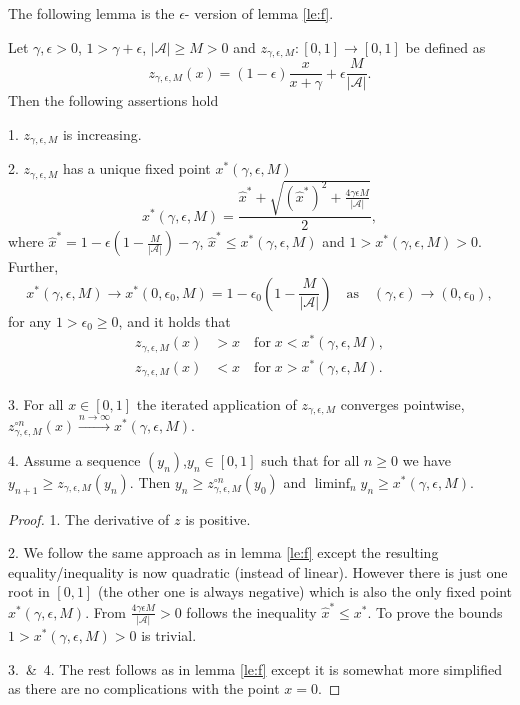 The following lemma is the $\epsilon$-\eUDRL{} version of lemma \ref{le:f}.
\begin{lemma}
\label{le:z}
Let $\gamma,\epsilon > 0$, $1 > \gamma +\epsilon$, $|\mathcal{A}| \geq M > 0$ and $z_{\gamma,\epsilon,M}:[0,1] \rightarrow [0,1]$ be defined as
$$
z_{\gamma,\epsilon,M}(x) =
(1-\epsilon)\frac{x}
{x + \gamma}
+ \epsilon \frac{M}{|\mathcal{A}|}.
$$
Then the following assertions hold
\begin{description}
\item{1.} $z_{\gamma,\epsilon,M}$ is increasing.
\item{2.} $z_{\gamma,\epsilon,M}$ has a unique fixed point $x^*(\gamma,\epsilon,M)$
$$
x^*(\gamma,\epsilon,M) = \frac{\hat{x}^* + \sqrt{(\hat{x}^*)^2+\frac{4\gamma\epsilon M}{|\mathcal{A}|}}}{2},
$$
where $\hat{x}^* = 1-\epsilon(1-\frac{M}{\mathcal{|A|}})-\gamma$, $\hat{x}^* \leq x^*(\gamma,\epsilon,M)$ and
$1> x^*(\gamma,\epsilon,M) >0$. Further,
$$
x^*(\gamma,\epsilon,M)
\rightarrow
x^*(0,\epsilon_0,M) =  1-\epsilon_0(1-\frac{M}{|\mathcal{A}|}) \quad\text{as}\quad
(\gamma,\epsilon)  \rightarrow (0,\epsilon_0),
$$
for any  $1>\epsilon_0 \geq 0$, and it holds that
$$
\begin{aligned}
z_{\gamma,\epsilon,M}(x) &> x \quad \text{for}\; x < x^*(\gamma,\epsilon,M),
\\
z_{\gamma,\epsilon,M}(x) &< x \quad \text{for}\; x > x^*(\gamma,\epsilon,M).
\end{aligned}
$$
\item{3.} For all $x\in [0,1]$ the iterated application of $z_{\gamma,\epsilon,M}$ converges pointwise, $z_{\gamma,\epsilon,M}^{\circ n} (x) \xrightarrow{n\rightarrow\infty} x^*(\gamma,\epsilon,M)$.
\item{4.} Assume a sequence $(y_n)$,$y_n \in [0,1]$ such that for all $n\geq 0$ we have 
$y_{n+1} \geq z_{\gamma,\epsilon,M}(y_n)$.
Then $y_n \geq z_{\gamma,\epsilon,M}^{\circ n}(y_0)$ and $\liminf_n y_n \geq x^*(\gamma,\epsilon,M)$.

\end{description}
\end{lemma}

\begin{proof}
1. The derivative of $z$ is positive.

2. We follow the same approach as in lemma \ref{le:f} except the resulting
equality/inequality is now quadratic (instead of linear). However there is just one
root in $[0,1]$ (the other one is always negative) which is also the
only fixed point $x^*(\gamma,\epsilon,M)$.
From $\frac{4\gamma\epsilon M}{|\mathcal{A}|} >0$ follows the inequality 
$\hat{x}^* \leq x^*$.
To prove the bounds $1>x^*(\gamma,\epsilon,M)>0$ is trivial. 

3.\ \&\ 4. The rest follows as in lemma \ref{le:f} except it is somewhat more simplified
as there are no complications with the point $x=0$.
\end{proof}

